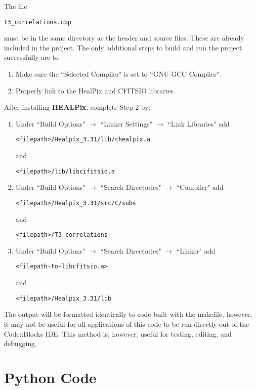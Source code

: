 \documentclass[12]{article}
\begin{document}
{\noindent The file 
\begin{verbatim}
T3_correlations.cbp
\end{verbatim} 
must be in the same directory as the header and source files. These are already included in the project. The only additional steps to build and run the project successfully are to 
\begin{enumerate}
\item Make sure the ``Selected Compiler" is set to ``GNU GCC Compiler".
\item Properly link to the HealPix and CFITSIO libraries.
\end{enumerate}
After installing {\bf HEALPix}, complete Step 2 by:
\begin{enumerate}
\item Under ``Build Options" $\rightarrow$ ``Linker Settings" $\rightarrow$ ``Link Libraries" add
\begin{verbatim}
<filepath>/Healpix_3.31/lib/chealpix.a
\end{verbatim} and 
\begin{verbatim}
<filepath>/lib/libcifitsio.a
\end{verbatim}
\item Under ``Build Options" $\rightarrow$ ``Search Directories" $\rightarrow$ ``Compiler" add 
\begin{verbatim}
<filepath>/Healpix_3.31/src/C/subs
\end{verbatim} and 
\begin{verbatim}
<filepath>/T3_correlations
\end{verbatim}
\item Under ``Build Options" $\rightarrow$ ``Search Directories" $\rightarrow$ ``Linker" add 
\begin{verbatim}
<filepath-to-libcfitsio.a>
\end{verbatim} and 
\begin{verbatim}
<filepath>/Healpix_3.31/lib
\end{verbatim}
\end{enumerate}

The output will be formatted identically to code built with the makefile, however, it may not be useful for all applications of this code to be run directly out of the Code::Blocks IDE. This method is, however, useful for testing, editing, and debugging.

\section{Python Code}

}
\end{document}
